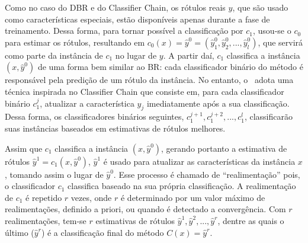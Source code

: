  Como no caso do DBR e do Classifier Chain, os rótulos reais $y$, que são usado como características especiais,
 estão disponíveis apenas durante a fase de treinamento. Dessa forma, para tornar possível a classificação por $c_1$, usou-se o $c_0$ para
 estimar os rótulos, %
 resultando em $c_0(x)=\hat{y}^0=(\hat{y}_1^0,\hat{y}_2^0,...,\hat{y}_l^0)$, que servirá como parte da instância de $c_1$
 no lugar de $y$. 
 A partir daí, $c_1$ classifica a instância $(x,\hat{y}^0)$ de uma forma bem similar ao BR:
 cada classificador binário do método é responsável pela predição de um rótulo da instância.
 No entanto, o \MRLMa~adota uma técnica inspirada no Classifier Chain que consiste em, para
 cada classificador binário $c_1^j$, atualizar a característica $\hat{y}_j$ imediatamente após 
 a sua classificação. Dessa forma, os classificadores binários seguintes, $c_1^{j+1},c_1^{j+2},...,c_1^{l}$,
 classificarão suas instâncias baseados em estimativas de rótulos melhores.

 Assim que $c_1$ classifica a instância $(x,\hat{y}^0)$, gerando portanto a estimativa de rótulos $\hat{y}^1=c_1(x,\hat{y}^0)$,
 $\hat{y}^1$ é usado para atualizar as características da instância $x$, tomando assim o lugar de $\hat{y}^0$.
 Esse processo é chamado de ``realimentação'' pois, o classificador $c_1$ classifica baseado na sua própria classificação.
 A realimentação de $c_1$ é repetido $r$ vezes,
 onde $r$ é determinado por um valor máximo de realimentações, definido a priori, ou quando é detectado a convergência.
 Com $r$ realimentações, tem-se $r$ estimativas de rótulos $\hat{y}^1,\hat{y}^2,...,\hat{y}^r$, dentre as quais o último ($\hat{y}^r$)
 é a classificação final do método $C(x)=\hat{y}^r$.
 
